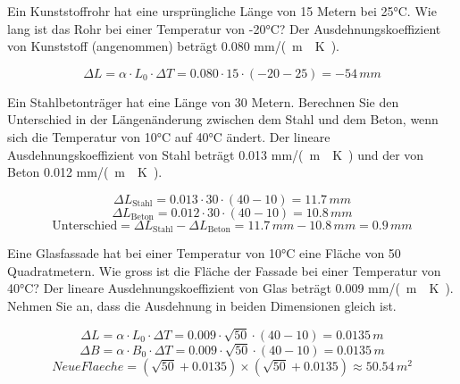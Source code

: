 \begin{questions}
\question Ein Kunststoffrohr hat eine ursprüngliche Länge von 15 Metern bei 25°C. Wie lang ist das Rohr bei einer Temperatur von -20°C? Der Ausdehnungskoeffizient von Kunststoff (angenommen) beträgt \num{0.080} \si{mm/(m\cdot K)}.
\begin{solution}
    \[ \Delta L = \alpha \cdot L_0 \cdot \Delta T = \num{0.080} \cdot 15 \cdot (-20 - 25) = \num{-54} \, \si{mm} \]
\end{solution}



\question Ein Stahlbetonträger hat eine Länge von 30 Metern. Berechnen Sie den Unterschied in der Längenänderung zwischen dem Stahl und dem Beton, wenn sich die Temperatur von 10°C auf 40°C ändert. Der lineare Ausdehnungskoeffizient von Stahl beträgt \num{0.013} \si{mm/(m\cdot K)} und der von Beton \num{0.012} \si{mm/(m\cdot K)}.
\begin{solution}
    \[ \Delta L_{\text{Stahl}} = \num{0.013} \cdot 30 \cdot (40 - 10) = \num{11.7} \, \si{mm} \]
    \[ \Delta L_{\text{Beton}} = \num{0.012} \cdot 30 \cdot (40 - 10) = \num{10.8} \, \si{mm} \]
    \[ \text{Unterschied} = \Delta L_{\text{Stahl}} - \Delta L_{\text{Beton}} = \num{11.7} \, \si{mm} - \num{10.8} \, \si{mm} = \num{0.9} \, \si{mm} \]
\end{solution}

\question Eine Glasfassade hat bei einer Temperatur von 10°C eine Fläche von 50 Quadratmetern. Wie gross ist die Fläche der Fassade bei einer Temperatur von 40°C? Der lineare Ausdehnungskoeffizient von Glas beträgt \num{0.009} \si{mm/(m\cdot K)}. Nehmen Sie an, dass die Ausdehnung in beiden Dimensionen gleich ist.
\begin{solution}
    \[ \Delta L = \alpha \cdot L_0 \cdot \Delta T = \num{0.009} \cdot \sqrt{50} \cdot (40 - 10) = \num{0.0135} \, \si{m} \]
    \[ \Delta B = \alpha \cdot B_0 \cdot \Delta T = \num{0.009} \cdot \sqrt{50} \cdot (40 - 10) = \num{0.0135} \, \si{m} \]
    \[ Neue Flaeche = (\sqrt{50} + 0.0135) \times (\sqrt{50} + 0.0135) \approx \num{50.54} \, \si{m^2} \]
\end{solution}

\end{questions}

